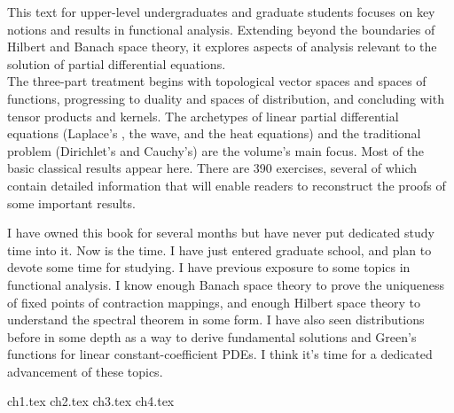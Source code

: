 \documentclass{../booknotes}
\begin{document}
	\maketitle

	\begin{pubdescrip}
		This text for upper-level undergraduates and graduate students focuses on key notions and results in functional analysis. Extending beyond the boundaries of Hilbert and Banach space theory, it explores aspects of analysis relevant to the solution of partial differential equations. \\
		\indent The three-part treatment begins with topological vector spaces and spaces of functions, progressing to duality and spaces of distribution, and concluding with tensor products and kernels. The archetypes of linear partial differential equations (Laplace's , the wave, and the heat equations) and the traditional problem (Dirichlet's and Cauchy's) are the volume's main focus. Most of the basic classical results appear here. There are 390 exercises, several of which contain detailed information that will enable readers to reconstruct the proofs of some important results.
	\end{pubdescrip}

	\begin{transcribernote}
		\indent I have owned this book for several months but have never put dedicated study time into it. Now is the time. I have just entered graduate school, and plan to devote some time for studying. I have previous exposure to some topics in functional analysis. I know enough Banach space theory to prove the uniqueness of fixed points of contraction mappings, and enough Hilbert space theory to understand the spectral theorem in some form. I have also seen distributions before in some depth as a way to derive fundamental solutions and Green's functions for linear constant-coefficient PDEs. I think it's time for a dedicated advancement of these topics.
	\end{transcribernote}
	
	{ch1.tex}
	{ch2.tex}
	{ch3.tex}
	{ch4.tex}
	
\end{document}

